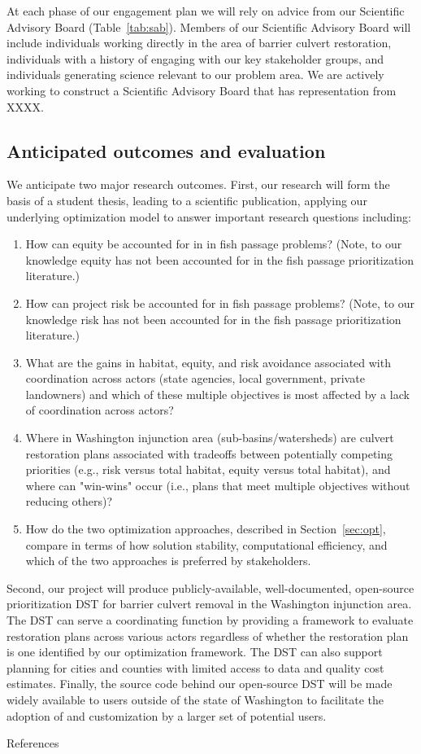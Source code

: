 \documentclass[12pt]{elsarticle}
\begin{document}
At each phase of our engagement plan we will rely on advice from our Scientific Advisory Board (Table~\ref{tab:sab}). Members of our Scientific Advisory Board will include individuals working directly in the area of barrier culvert restoration, individuals with a history of engaging with our key stakeholder groups, and individuals generating science relevant to our problem area. We are actively working to construct a Scientific Advisory Board that has representation from XXXX.

\subsection{Anticipated outcomes and evaluation}

We anticipate two major research outcomes. First, our research will form the basis of a student thesis, leading to a scientific publication, applying our underlying optimization model to answer important research questions including:

\begin{enumerate}
\item How can equity be accounted for in in fish passage problems? (Note, to our knowledge equity has not been accounted for in the fish passage prioritization literature.)
\item How can project risk be accounted for in fish passage problems? (Note, to our knowledge risk has not been accounted for in the fish passage prioritization literature.)
\item What are the gains in habitat, equity, and risk avoidance associated with coordination across actors (state agencies, local government, private landowners) and which of these multiple objectives is most affected by a lack of coordination across actors?
\item Where in Washington injunction area (sub-basins/watersheds) are culvert restoration plans associated with tradeoffs between potentially competing priorities (e.g., risk versus total habitat, equity versus total habitat), and where can "win-wins" occur (i.e., plans that meet multiple objectives without reducing others)?
\item How do the two optimization approaches, described in Section~\ref{sec:opt}, compare in terms of how solution stability, computational efficiency, and which of the two approaches is preferred by stakeholders.
\end{enumerate}


Second, our project will produce publicly-available, well-documented, open-source prioritization DST for barrier culvert removal in the Washington injunction area. The DST can serve a coordinating function by providing a framework to evaluate restoration plans across various actors regardless of whether the restoration plan is one identified by our optimization framework. The DST can also support planning for cities and counties with limited access to data and quality cost estimates. Finally, the source code behind our open-source DST will be made widely available to users outside of the state of Washington to facilitate the adoption of and customization by a larger set of potential users. 


\clearpage
\large References\\
\normalsize

\end{document}
